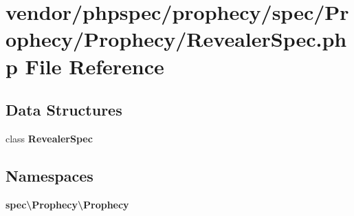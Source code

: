 \section{vendor/phpspec/prophecy/spec/\+Prophecy/\+Prophecy/\+Revealer\+Spec.php File Reference}
\label{_revealer_spec_8php}
\subsection*{Data Structures}
\begin{DoxyCompactItemize}
\item 
class {\bf Revealer\+Spec}
\end{DoxyCompactItemize}
\subsection*{Namespaces}
\begin{DoxyCompactItemize}
\item 
 {\bf spec\textbackslash{}\+Prophecy\textbackslash{}\+Prophecy}
\end{DoxyCompactItemize}
